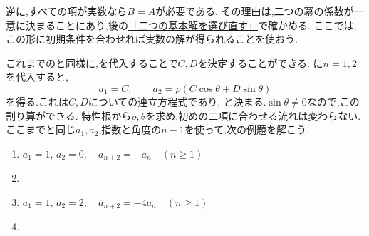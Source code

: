   逆に,すべての項が実数なら$B=\overline A$が必要である.
  その理由は,二つの冪の係数が一意に決まることにあり,後の\hyperref[解釈：虚数解と基本解]{「二つの基本解を選び直す」}で確かめる.
  ここでは,この形に初期条件を合わせれば実数の解が得られることを使おう.

  これまでのと同様に,を代入することで$C,D$を決定することができる.
  に$n=1,2$を代入すると,
  \[
    a_1=C,\qquad a_2=\rho(C\cos\theta+D\sin\theta)
  \]
  を得る.これは$C,D$についての連立方程式であり,
  \BookMathLayout{\[
    C=a_1,\qquad
    D=\cfrac{\frac{a_2}{\rho}-a_1\cos\theta}{\sin\theta}
  \]}{\[
    \begin{aligned}
      C&=a_1,\\
      D&=\cfrac{\frac{a_2}{\rho}-a_1\cos\theta}{\sin\theta}
    \end{aligned}
  \]}
  と決まる.$\sin\theta\ne0$なので,この割り算ができる.
  特性根から$\rho,\theta$を求め,初めの二項に合わせる流れは変わらない.
  ここまでと同じ$a_1,a_2$,指数と角度の$n-1$を使って,次の例題を解こう.

  \noindent {}\par\nobreak
  \begin{enumerate}[label=(\arabic*),parsep=3pt,format=\bookitemlink{example-complex-1}{problem}{answer}]
    \item $\displaystyle a_1=1,\,a_2=0,\quad a_{n+2}=-a_n\quad(n\ge1)$
\item {}
    \item $\displaystyle a_1=1,\,a_2=2,\quad a_{n+2}=-4a_n\quad(n\ge1)$
\item {}
  \end{enumerate}

